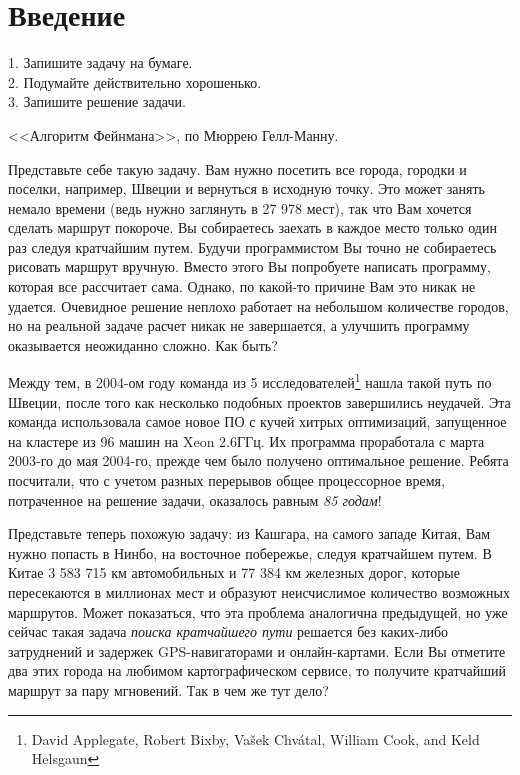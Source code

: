 \chapter{Введение}
\label{chap:intro}

\epigraph{
1. Запишите задачу на бумаге.\\
2. Подумайте действительно хорошенько.\\
3. Запишите решение задачи.
}{<<Алгоритм Фейнмана>>, по Мюррею Гелл-Манну.}


Представьте себе такую задачу. Вам нужно посетить все города, городки и поселки, например, Швеции и вернуться в исходную точку. Это может занять немало времени (ведь нужно заглянуть в 27 978 мест), так что Вам хочется сделать маршрут покороче. Вы собираетесь заехать в каждое место только один раз следуя кратчайшим путем. Будучи программистом Вы точно не собираетесь рисовать маршрут вручную. Вместо этого Вы попробуете написать программу, которая все рассчитает сама. Однако, по какой-то причине Вам это никак не удается. Очевидное решение неплохо работает на небольшом количестве городов, но на реальной задаче расчет никак не завершается, а улучшить программу оказывается неожиданно сложно. Как быть?

Между тем, в 2004-ом году команда из 5 исследователей\footnote{David Applegate, Robert Bixby, Vašek Chvátal, William Cook, and Keld Helsgaun} нашла такой путь по Швеции, после того как несколько подобных проектов завершились неудачей. Эта команда использовала самое новое ПО с кучей хитрых оптимизаций, запущенное на кластере из 96 машин на Xeon 2.6ГГц. Их программа проработала с марта 2003-го до мая 2004-го, прежде чем было получено оптимальное решение. Ребята посчитали, что с учетом разных перерывов общее процессорное время, потраченное на решение задачи, оказалось равным \textit{85 годам}!

Представьте теперь похожую задачу: из Кашгара, на самого западе Китая, Вам нужно попасть в Нинбо, на восточное побережье, следуя кратчайшем путем. В Китае 3 583 715 км автомобильных и 77 384 км железных дорог, которые пересекаются в миллионах мест и образуют неисчислимое количество возможных маршрутов. Может показаться, что эта проблема аналогична предыдущей, но уже сейчас такая задача \textit{поиска кратчайшего пути} решается без каких-либо затруднений и задержек GPS-навигаторами и онлайн-картами. Если Вы отметите два этих города на любимом картографическом сервисе, то получите кратчайший маршрут за пару мгновений. Так в чем же тут дело?

